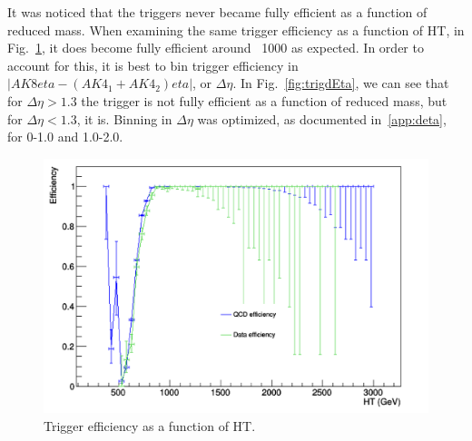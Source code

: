 It was noticed that the triggers never became fully efficient as a function of reduced mass. When examining the same trigger efficiency as a function of HT, in Fig.~\ref{fig:trigHTeff}, it does become fully efficient around ~1000 \GeV as expected. In order to account for this, it is best to bin trigger efficiency in $|AK8 eta - (AK4_1 + AK4_2) eta|$, or $\Delta\eta$. In Fig.~\ref{fig:trigdEta}, we can see that for $\Delta\eta > 1.3$ the trigger is not fully efficient as a function of reduced mass, but for $\Delta\eta < 1.3$, it is. Binning in $\Delta\eta$ was optimized, as documented in~\ref{app:deta}, for 0-1.0 and 1.0-2.0.

\begin{figure}[thb!]
\begin{center}
\includegraphics[scale=0.5]{Figures/trigHTfulleff.pdf}
\end{center}
\caption{Trigger efficiency as a function of HT.}
\label{fig:trigHTeff}
\end{figure}


